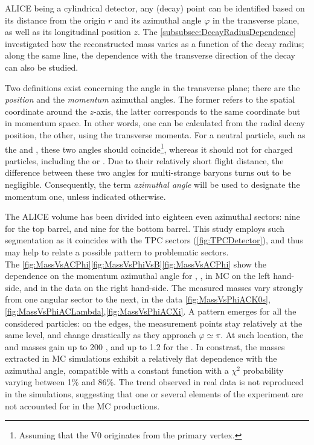 ALICE being a cylindrical detector, any (decay) point can be identified based on its distance from the origin $r$ and its azimuthal angle $\varphi$ in the transverse plane, as well as its longitudinal position $z$. The \Sec\ref{subsubsec:DecayRadiusDependence} investigated how the reconstructed mass varies as a function of the decay radius; along the same line, the dependence with the transverse direction of the decay can also be studied.

Two definitions exist concerning the angle in the transverse plane; there are the \textit{position} and the \textit{momentum} azimuthal angles. The former refers to the spatial coordinate around the $z$-axis, the latter corresponds to the same coordinate but in momentum space. In other words, one can be calculated from the radial decay position, the other, using the transverse momenta. For a neutral particle, such as the \rmKzeroS and \rmLambda, these two angles should coincide\footnote{Assuming that the V0 originates from the primary vertex.}, whereas it should not for charged particles, including the \rmXi or \rmOmega. Due to their relatively short flight distance, the difference between these two angles for multi-strange baryons turns out to be negligible. Consequently, the term \textit{azimuthal angle} will be used to designate the momentum one, unless indicated otherwise.

The ALICE volume has been divided into eighteen even azimuthal sectors: nine for the top barrel, and nine for the bottom barrel. This study employs such segmentation as it coincides with the TPC sectors (\fig\ref{fig:TPCDetector}), and thus may help to relate a possible pattern to problematic sectors.\\

The \figs\ref{fig:MassVsACPhi}\ref{fig:MassVsPhiVsB}\ref{fig:MassVsACPhi} show the dependence on the momentum azimuthal angle for \rmKzeroS, \rmLambda, \rmXi in MC on the left hand-side, and in the data on the right hand-side. The measured masses vary strongly from one angular sector to the next, in the data \figs\ref{fig:MassVsPhiACK0s},\ref{fig:MassVsPhiACLambda},\ref{fig:MassVsPhiACXi}. A pattern emerges for all the considered particles: on the edges, the measurement points stay relatively at the same level, and change drastically as they approach $\varphi \simeq \pi$. At such location, the \rmLambda and \rmXi masses gain up to 200 \kmass, and up to 1.2 \mmass for the \rmKzeroS. In constrast, the masses extracted in MC simulations exhibit a relatively flat dependence with the azimuthal angle, compatible with a constant function with a $\chi^{2}$ probability varying between 1\% and 86\%. The trend observed in real data is not reproduced in the simulations, suggesting that one or several elements of the experiment are not accounted for in the MC productions.

